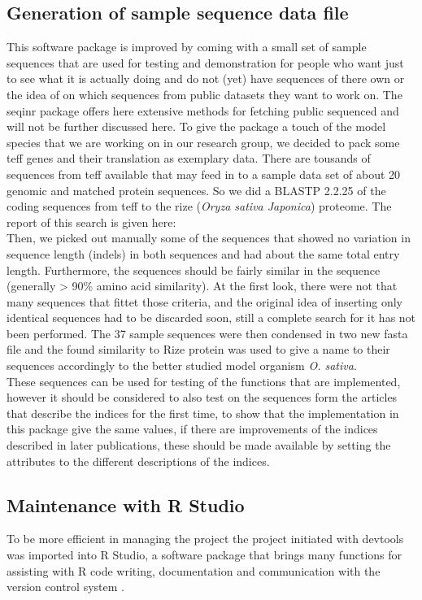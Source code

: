 \subsection{Generation of sample sequence data file}
This software package is improved by coming with a small set of sample sequences that are used for testing and demonstration for people who want just to see what it is actually doing and do not (yet) have sequences of there own or the idea of on which sequences from public datasets they want to work on. The seqinr package offers here extensive methods for fetching public sequenced and will not be further discussed here. 
To give the package a touch of the model species that we are working on in our research group, we decided to pack some teff genes and their translation as exemplary data. There are tousands of sequences from teff available that may feed in to a sample data set of about 20 genomic and matched protein sequences. So we did a BLASTP 2.2.25 of the coding sequences from teff to the rize (\textit{Oryza sativa Japonica}) proteome. The report of this search is given here:\\
  
Then, we picked out manually some of the sequences that showed no variation in sequence length (indels) in both sequences and had about the same total entry length. Furthermore, the sequences should be fairly similar in the sequence (generally > 90\% amino acid similarity). At the first look, there were not that many sequences that fittet those criteria, and the original idea of inserting only identical sequences had to be discarded soon, still a complete search for it has not been performed. The 37 sample sequences were then condensed in two new fasta file and the found similarity to Rize protein was used to give a name to their sequences accordingly to the better studied model organism \textit{O. sativa}. \\
These sequences can be used for testing of the functions that are implemented, however it should be considered to also test on the sequences form the articles that describe the indices for the first time, to show that the implementation in this package give the same values, if there are improvements of the indices described in later publications, these should be made available by setting the attributes to the different descriptions of the indices. \\

\subsection{Maintenance with R Studio}
To be more efficient in managing the project the project initiated with devtools was imported into R Studio, a software package that brings many functions for assisting with R code writing, documentation and communication with the version control system \cite{Rstudio2015}. 


